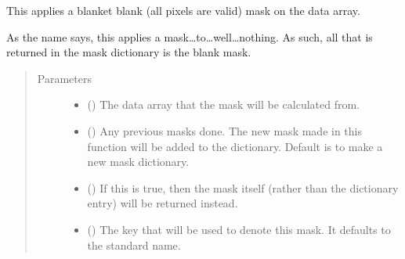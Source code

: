 \documentclass[letterpaper,10pt,english]{sphinxmanual}
\begin{document}
\begin{fulllineitems}
\label{\detokenize{python_docstrings/IfA_Smeargle.echo.masks.masks_echo300:IfA_Smeargle.echo.masks.masks_echo300.echo398_nothing}}
This applies a blanket blank (all pixels are valid) mask on the
data array.

As the name says, this applies a mask…to…well…nothing. As such,
all that is returned in the mask dictionary is the blank mask.
\begin{quote}\begin{description}
\item[{Parameters}] \leavevmode\begin{itemize}
\item {} 
 () \textendash{} The data array that the mask will be calculated from.

\item {} 
 (\sphinxstyleliteralemphasis{\sphinxupquote{ (}}\sphinxstyleliteralemphasis{\sphinxupquote{)}}) \textendash{} Any previous masks done. The new mask made in this function will be
added to the dictionary. Default is to make a new mask dictionary.

\item {} 
 (\sphinxstyleliteralemphasis{\sphinxupquote{ (}}\sphinxstyleliteralemphasis{\sphinxupquote{)}}) \textendash{} If this is true, then the mask itself (rather than the dictionary
entry) will be returned instead.

\item {} 
 (\sphinxstyleliteralemphasis{\sphinxupquote{ (}}\sphinxstyleliteralemphasis{\sphinxupquote{)}}) \textendash{} The key that will be used to denote this mask. It defaults to the
standard name.


\end{itemize}
\end{description}
\end{quote}
\end{fulllineitems}
\end{document}
